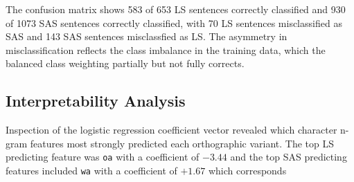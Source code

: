 \documentclass[11pt,a4paper]{article}
\begin{document}
The confusion matrix shows 583 of 653 LS sentences correctly classified and 930 of 1073 SAS sentences correctly classified, with 70 LS sentences misclassified as SAS and 143 SAS sentences misclassfied as LS. The asymmetry in misclassification reflects the class imbalance in the training data, which the balanced class weighting partially but not fully corrects.

\subsection{Interpretability Analysis}

Inspection of the logistic regression coefficient vector revealed which character n-gram features most strongly predicted each orthographic variant. The top LS predicting feature was \texttt{oa} with a coefficient of $-3.44$ and the top SAS predicting features included \texttt{wa} with a coefficient of $+1.67$ which corresponds 
\end{document}
